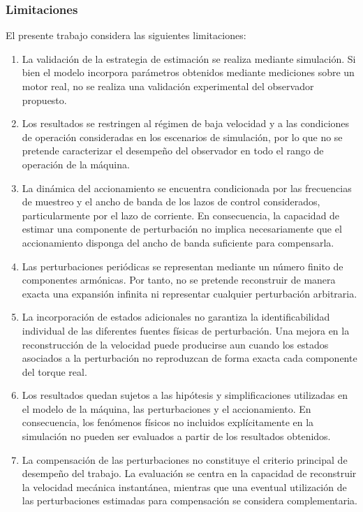 \subsubsection{Limitaciones}

El presente trabajo considera las siguientes limitaciones:

\begin{enumerate}

    \item La validación de la estrategia de estimación se realiza mediante
    simulación. Si bien el modelo incorpora parámetros obtenidos mediante
    mediciones sobre un motor real, no se realiza una validación experimental
    del observador propuesto.

    \item Los resultados se restringen al régimen de baja velocidad y a las
    condiciones de operación consideradas en los escenarios de simulación,
    por lo que no se pretende caracterizar el desempeño del observador en todo
    el rango de operación de la máquina.

    \item La dinámica del accionamiento se encuentra condicionada por las
    frecuencias de muestreo y el ancho de banda de los lazos de control
    considerados, particularmente por el lazo de corriente. En consecuencia,
    la capacidad de estimar una componente de perturbación no implica
    necesariamente que el accionamiento disponga del ancho de banda suficiente
    para compensarla.

    \item Las perturbaciones periódicas se representan mediante un número
    finito de componentes armónicas. Por tanto, no se pretende reconstruir de
    manera exacta una expansión infinita ni representar cualquier perturbación
    arbitraria.

    \item La incorporación de estados adicionales no garantiza la
    identificabilidad individual de las diferentes fuentes físicas de
    perturbación. Una mejora en la reconstrucción de la velocidad puede
    producirse aun cuando los estados asociados a la perturbación no
    reproduzcan de forma exacta cada componente del torque real.

    \item Los resultados quedan sujetos a las hipótesis y simplificaciones
    utilizadas en el modelo de la máquina, las perturbaciones y el
    accionamiento. En consecuencia, los fenómenos físicos no incluidos
    explícitamente en la simulación no pueden ser evaluados a partir de los
    resultados obtenidos.

    \item La compensación de las perturbaciones no constituye el criterio
    principal de desempeño del trabajo. La evaluación se centra en la capacidad
    de reconstruir la velocidad mecánica instantánea, mientras que una eventual
    utilización de las perturbaciones estimadas para compensación se considera
    complementaria.

\end{enumerate}
